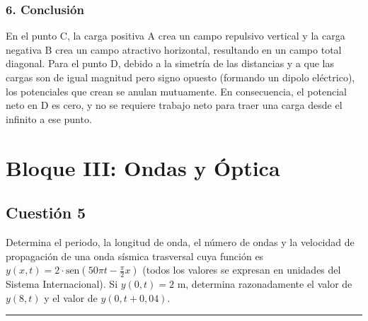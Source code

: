 \subsubsection*{6. Conclusión}
\begin{cajaconclusion}
En el punto C, la carga positiva A crea un campo repulsivo vertical y la carga negativa B crea un campo atractivo horizontal, resultando en un campo total diagonal. Para el punto D, debido a la simetría de las distancias y a que las cargas son de igual magnitud pero signo opuesto (formando un dipolo eléctrico), los potenciales que crean se anulan mutuamente. En consecuencia, el potencial neto en D es cero, y no se requiere trabajo neto para traer una carga desde el infinito a ese punto.
\end{cajaconclusion}

\newpage

\section{Bloque III: Ondas y Óptica}
\label{sec:ondasopt_2023_jul_ord}

\subsection{Cuestión 5}
\label{subsec:C5_2023_jul_ord}

\begin{cajaenunciado}
Determina el periodo, la longitud de onda, el número de ondas y la velocidad de propagación de una onda sísmica trasversal cuya función es $y(x,t)=2\cdot\text{sen}(50\pi t - \frac{\pi}{2}x)$ (todos los valores se expresan en unidades del Sistema Internacional). Si $y(0,t)=2$ m, determina razonadamente el valor de $y(8,t)$ y el valor de $y(0, t+0,04)$.
\end{cajaenunciado}
\hrule

